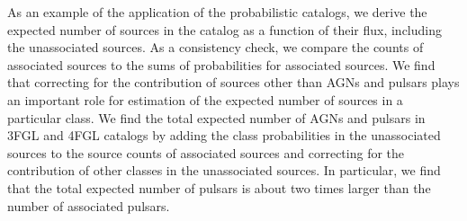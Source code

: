 As an example of the application of the probabilistic catalogs, we derive the expected number of sources in the catalog as a function of their flux, including the unassociated sources.
As a consistency check, we compare the counts of associated sources to the sums of probabilities for associated sources.
We find that correcting for the contribution of sources other than AGNs and pulsars plays an important role for estimation of the expected number of sources in a particular class.
We find the total expected number of AGNs and pulsars in 3FGL and 4FGL catalogs by adding the class probabilities in the unassociated sources to the source counts of associated sources and correcting for the contribution of other classes in the unassociated sources.
In particular, we find that the total expected number of pulsars is about two times larger than the number of associated pulsars.

